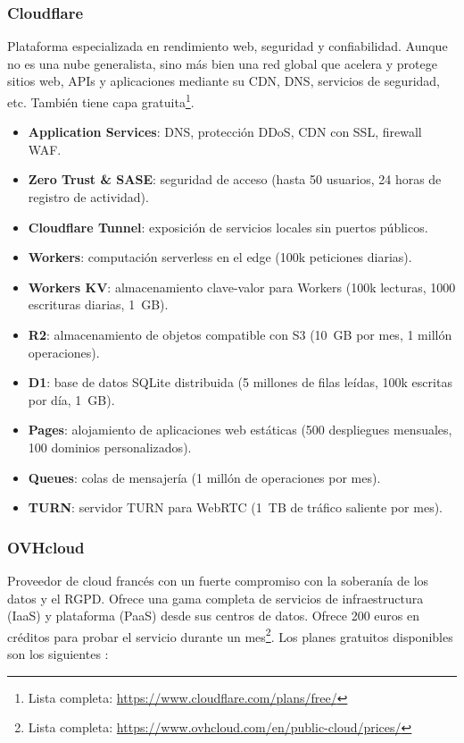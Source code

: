 \subsubsection*{Cloudflare}

Plataforma especializada en rendimiento web, seguridad y confiabilidad. Aunque no es una nube generalista, sino más bien una red global que acelera y protege sitios web, APIs y aplicaciones mediante su CDN, DNS, servicios de seguridad, etc. También tiene capa gratuita\footnote{Lista completa: \url{https://www.cloudflare.com/plans/free/}}.

\begin{itemize}
	\item \textbf{Application Services}: DNS, protección DDoS, CDN con SSL, firewall WAF.
	\item \textbf{Zero Trust \& SASE}: seguridad de acceso (hasta 50 usuarios, 24 horas de registro de actividad).
	\item \textbf{Cloudflare Tunnel}: exposición de servicios locales sin puertos públicos.
	\item \textbf{Workers}: computación serverless en el edge (100k peticiones diarias).
	\item \textbf{Workers KV}: almacenamiento clave-valor para Workers (100k lecturas, 1000 escrituras diarias, 1~GB).
	\item \textbf{R2}: almacenamiento de objetos compatible con S3 (10~GB por mes, 1 millón operaciones).
	\item \textbf{D1}: base de datos SQLite distribuida (5 millones de filas leídas, 100k escritas por día, 1~GB).
	\item \textbf{Pages}: alojamiento de aplicaciones web estáticas (500 despliegues mensuales, 100 dominios personalizados).
	\item \textbf{Queues}: colas de mensajería (1 millón de operaciones por mes).
	\item \textbf{TURN}: servidor TURN para WebRTC (1~TB de tráfico saliente por mes).
\end{itemize}

\subsubsection*{OVHcloud}

Proveedor de cloud francés con un fuerte compromiso con la soberanía de los datos y el RGPD. Ofrece una gama completa de servicios de infraestructura (IaaS) y plataforma (PaaS) desde sus centros de datos. Ofrece 200 euros en créditos para probar el servicio durante un mes\footnote{Lista completa: \url{https://www.ovhcloud.com/en/public-cloud/prices/}}. Los planes gratuitos disponibles son los siguientes \citep{OVHCloudFree}:

